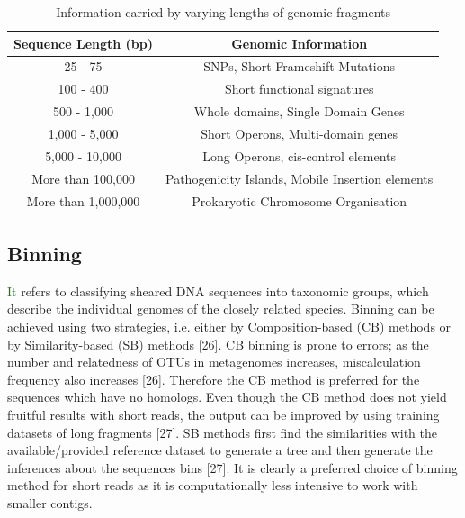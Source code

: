 \begin{table}[ht]
\centering
\caption{Information carried by varying lengths of genomic fragments}
 \begin{tabular}{|c | c|} 
 \hline
 Sequence Length (bp) & Genomic Information \\ [0.5ex] 
 \hline\hline
 25 - 75 & SNPs, Short Frameshift Mutations \\ 
 \hline
 100 - 400 & Short functional signatures \\
 \hline
 500 - 1,000 & Whole domains, Single Domain Genes \\
 \hline
 1,000 - 5,000 & Short Operons, Multi-domain genes \\
 \hline
 5,000 - 10,000 & Long Operons, cis-control elements \\
 \hline
 More than 100,000 & Pathogenicity Islands, Mobile Insertion elements \\
 \hline
 More than 1,000,000 & Prokaryotic Chromosome Organisation \\
 \hline
\end{tabular}
\label{table1}
\end{table}

\subsection{Binning}
\textcolor{green}{It} refers to classifying sheared DNA sequences into taxonomic groups, which describe the individual genomes of the closely related species. Binning can be achieved using two strategies, i.e. either by Composition-based (CB) methods or by Similarity-based (SB) methods [26]. CB binning is prone to errors; as the number and relatedness of OTUs in metagenomes increases, miscalculation frequency also increases [26]. Therefore the CB method is preferred for the sequences which have no homologs. Even though the CB method does not yield fruitful results with short reads, the output can be improved by using training datasets of long fragments [27]. SB methods first find the similarities with the available/provided reference dataset to generate a tree and then generate the inferences about the sequences bins [27]. It is clearly a preferred choice of binning method for short reads as it is computationally less intensive to work with smaller contigs.

